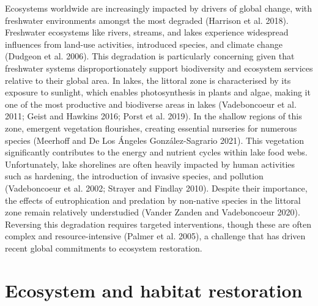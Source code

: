 \documentclass[
  12pt,
  a4paper,
  oneside]{scrbook}
\begin{document}
Ecosystems worldwide are increasingly impacted by drivers of global
change, with freshwater environments amongst the most degraded (Harrison
et al. 2018). Freshwater ecosystems like rivers, streams, and lakes
experience widespread influences from land-use activities, introduced
species, and climate change (Dudgeon et al. 2006). This degradation is
particularly concerning given that freshwater systems disproportionately
support biodiversity and ecosystem services relative to their global
area. In lakes, the littoral zone is characterised by its exposure to
sunlight, which enables photosynthesis in plants and algae, making it
one of the most productive and biodiverse areas in lakes (Vadeboncoeur
et al. 2011; Geist and Hawkins 2016; Porst et al. 2019). In the shallow
regions of this zone, emergent vegetation flourishes, creating essential
nurseries for numerous species (Meerhoff and De Los Ángeles
González-Sagrario 2021). This vegetation significantly contributes to
the energy and nutrient cycles within lake food webs. Unfortunately,
lake shorelines are often heavily impacted by human activities such as
hardening, the introduction of invasive species, and pollution
(Vadeboncoeur et al. 2002; Strayer and Findlay 2010). Despite their
importance, the effects of eutrophication and predation by non-native
species in the littoral zone remain relatively understudied (Vander
Zanden and Vadeboncoeur 2020). Reversing this degradation requires
targeted interventions, though these are often complex and
resource-intensive (Palmer et al. 2005), a challenge that has driven
recent global commitments to ecosystem restoration.

\section{Ecosystem and habitat
restoration}\label{ecosystem-and-habitat-restoration}
\end{document}
